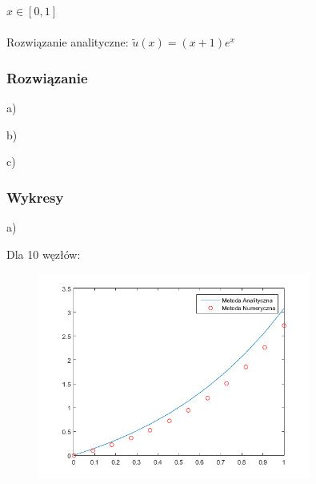 $x\in [0,1]$
\\
\\
Rozwiązanie analityczne: $\widetilde{u}(x) = (x+1)e^x$

\subsubsection{Rozwiązanie}


\begin{samepage}
a)

\end{samepage}
\newpage
\begin{samepage}
b)

\end{samepage}
\newpage
\begin{samepage}
c)

\end{samepage}

\newpage

\subsubsection{Wykresy}

a)\\
\begin{samepage}
	Dla 10 węzłów:
	
	
	
	\FloatBarrier
	\begin{figure}[!ht]
		\begin{center}
			\includegraphics[width=0.8\textwidth]{Lab4/charts/zad4/1/10.png}
		\end{center}
	\end{figure}
	\FloatBarrier
\end{samepage}


